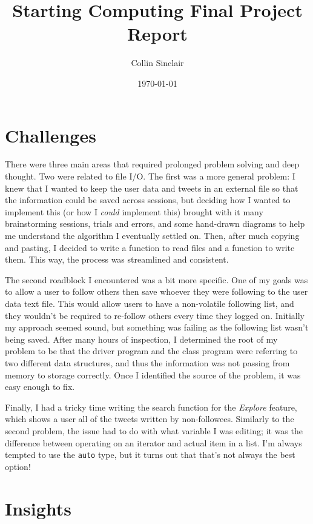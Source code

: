 \documentclass[twocolumn]{article}
\title{Starting Computing Final Project Report}
\author{Collin Sinclair}
\date{\today}
\begin{document}
\maketitle

\section*{Challenges}

There were three main areas that required prolonged problem solving and deep thought. Two were related to file I/O. The first was a more general problem: I knew that I wanted to keep the user data and tweets in an external file so that the information could be saved across sessions, but deciding how I wanted to implement this (or how I \textit{could} implement this) brought with it many brainstorming sessions, trials and errors, and some hand-drawn diagrams to help me understand the algorithm I eventually settled on. Then, after much copying and pasting, I decided to write a function to read files and a function to write them. This way, the process was streamlined and consistent.

The second roadblock I encountered was a bit more specific. One of my goals was to allow a user to follow others then save whoever they were following to the user data text file. This would allow users to have a non-volatile following list, and they wouldn't be required to re-follow others every time they logged on. Initially my approach seemed sound, but something was failing as the following list wasn't being saved. After many hours of inspection, I determined the root of my problem to be that the driver program and the class program were referring to two different data structures, and thus the information was not passing from memory to storage correctly. Once I identified the source of the problem, it was easy enough to fix.

Finally, I had a tricky time writing the search function for the \textit{Explore} feature, which shows a user all of the tweets written by non-followees. Similarly to the second problem, the issue had to do with what variable I was editing; it was the difference between operating on an iterator and actual item in a list. I'm always tempted to use the \texttt{auto} type, but it turns out that that's not always the best option!

\section*{Insights}
\end{document}
